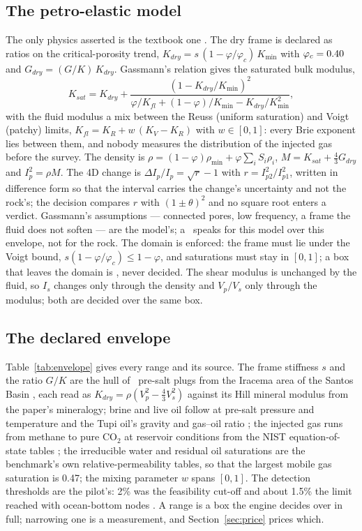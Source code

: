 \documentclass[preprint,11pt,authoryear]{elsarticle}
\begin{document}
\subsection{The petro-elastic model}
The only physics asserted is the textbook one \citep{mavko2009}. The dry frame is declared as ratios on the critical-porosity trend, $K_{dry} = s\,(1 - \varphi/\varphi_c)\,K_{\min}$ with $\varphi_c = 0.40$ \citep{nur1998} and $G_{dry} = (G/K)\,K_{dry}$. Gassmann's relation gives the saturated bulk modulus,
\begin{equation}
K_{sat} = K_{dry} + \frac{(1 - K_{dry}/K_{\min})^2}{\varphi/K_{fl} + (1-\varphi)/K_{\min} - K_{dry}/K_{\min}^2},
\end{equation}
with the fluid modulus a mix between the Reuss (uniform saturation) and Voigt (patchy) limits, $K_{fl} = K_R + w\,(K_V - K_R)$ with $w \in [0, 1]$: every Brie exponent \citep{brie1995} lies between them, and nobody measures the distribution of the injected gas before the survey. The density is $\rho = (1-\varphi)\rho_{\min} + \varphi\sum_i S_i\rho_i$, $M = K_{sat} + \tfrac{4}{3}G_{dry}$ and $I_p^2 = \rho M$. The 4D change is $\Delta I_p/I_p = \sqrt{r} - 1$ with $r = I_{p2}^2/I_{p1}^2$, written in difference form so that the interval carries the change's uncertainty and not the rock's; the decision compares $r$ with $(1 \pm \theta)^2$ and no square root enters a verdict. Gassmann's assumptions --- connected pores, low frequency, a frame the fluid does not soften --- are the model's; a \vProved\ speaks for this model over this envelope, not for the rock. The domain is enforced: the frame must lie under the Voigt bound, $s(1 - \varphi/\varphi_c) \le 1 - \varphi$, and saturations must stay in $[0, 1]$; a box that leaves the domain is \vRefused, never decided. The shear modulus is unchanged by the fluid, so $I_s$ changes only through the density and $V_p/V_s$ only through the modulus; both are decided over the same box.

\subsection{The declared envelope}
Table~\ref{tab:envelope} gives every range and its source. The frame stiffness $s$ and the ratio $G/K$ are the hull of \DPlugs\ pre-salt plugs from the Iracema area of the Santos Basin \citep{quadros2025}, each read as $K_{dry} = \rho(V_p^2 - \tfrac{4}{3}V_s^2)$ against its Hill mineral modulus from the paper's mineralogy; brine and live oil follow \citet{batzle1992} at pre-salt pressure and temperature and the Tupi oil's gravity and gas--oil ratio \citep{cruz2021a}; the injected gas runs from methane to pure CO$_2$ at reservoir conditions from the NIST equation-of-state tables \citep{nist,span1996,setzmann1991}; the irreducible water and residual oil saturations are the benchmark's own relative-permeability tables, so that the largest mobile gas saturation is 0.47; the mixing parameter $w$ spans $[0, 1]$. The detection thresholds are the pilot's: 2\% was the feasibility cut-off and about 1.5\% the limit reached with ocean-bottom nodes \citep{cruz2021a,cruz2021b}. A range is a box the engine decides over in full; narrowing one is a measurement, and Section~\ref{sec:price} prices which.
\end{document}
